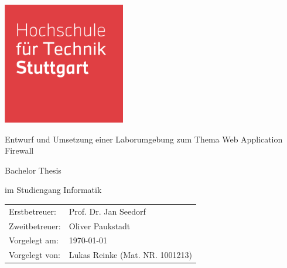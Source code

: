 \begin{titlepage}
    \includegraphics[width=0.4\textwidth]{images/HFT_logo}
    \centering
    \vspace{1.5cm}
    {\par \LARGE Entwurf und Umsetzung einer Laborumgebung zum Thema Web Application Firewall\par}
    \vspace{1cm}
    {\par \large Bachelor Thesis\par}
    {\par \large im Studiengang Informatik\par}
    \vfill
    \begin{table}[!hbt]
        \centering
        \begin{tabular}{ll}
            Erstbetreuer:               & Prof. Dr. Jan Seedorf           \\
            Zweitbetreuer:              & Oliver Paukstadt                \\
            Vorgelegt am:               & \today                          \\
            Vorgelegt von:              & Lukas Reinke (Mat. NR. 1001213)
        \end{tabular}\label{tab:info}
    \end{table}
\end{titlepage}